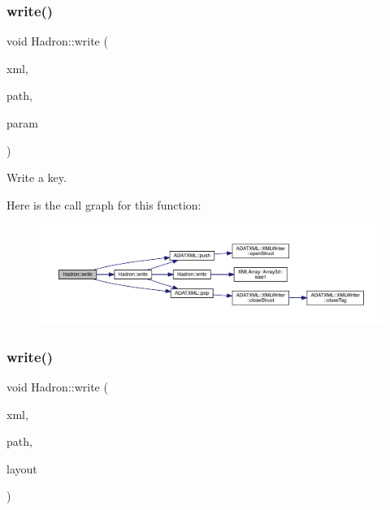 \subsubsection{\texorpdfstring{write()}{write()}\hspace{0.1cm}{\footnotesize\ttfamily [6/95]}}
{\footnotesize\ttfamily void Hadron\+::write (\begin{DoxyParamCaption}\item[{\mbox{\hyperlink{classADATXML_1_1XMLWriter}{X\+M\+L\+Writer}} \&}]{xml,  }\item[{const std\+::string \&}]{path,  }\item[{const \mbox{\hyperlink{structHadron_1_1KeyCGCIrrepMom__t}{Key\+C\+G\+C\+Irrep\+Mom\+\_\+t}} \&}]{param }\end{DoxyParamCaption})}



Write a key. 

Here is the call graph for this function\+:
\nopagebreak
\begin{figure}[H]
\begin{center}
\leavevmode
\includegraphics[width=350pt]{d1/daf/namespaceHadron_a2454ead756c8c4f2b1f75bbf8d3c1070_cgraph}
\end{center}
\end{figure}
\mbox{\label{namespaceHadron_ae327bbb04efa053f7be135b73bb596a7}} 
\subsubsection{\texorpdfstring{write()}{write()}\hspace{0.1cm}{\footnotesize\ttfamily [7/95]}}
{\footnotesize\ttfamily void Hadron\+::write (\begin{DoxyParamCaption}\item[{\mbox{\hyperlink{classADATXML_1_1XMLWriter}{X\+M\+L\+Writer}} \&}]{xml,  }\item[{const std\+::string \&}]{path,  }\item[{const \mbox{\hyperlink{structHadron_1_1Layout_1_1Layout__t}{Layout\+::\+Layout\+\_\+t}} \&}]{layout }\end{DoxyParamCaption})}

